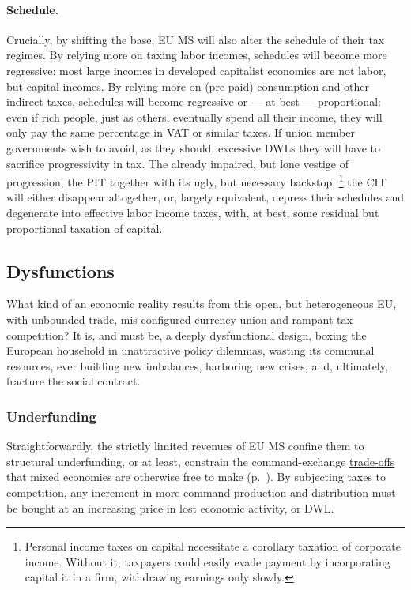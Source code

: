 \paragraph{Schedule.} Crucially, by shifting the base, \gls{EU} \gls{MS} will also alter the schedule of their tax regimes.
By relying more on taxing labor incomes, schedules will become more regressive:
most large incomes in developed capitalist economies are not labor, but capital incomes.
By relying more on (pre-paid) consumption and other indirect taxes, schedules will become regressive or --- at best --- proportional:
even if rich people, just as others, eventually spend all their income, they will only pay the same percentage in \gls{VAT} or similar taxes.
If union member governments wish to avoid, as they should, excessive \glspl{DWL} they will have to sacrifice progressivity in tax.
The already impaired, but lone vestige of progression, the \gls{PIT} together with its ugly, but necessary backstop,
\footnote{
	Personal income taxes on capital necessitate a corollary taxation of corporate income.
	Without it, taxpayers could easily evade payment by incorporating capital it in a firm, withdrawing earnings only slowly.
}
the \gls{CIT} will either disappear altogether, or, largely equivalent, depress their schedules and degenerate into effective labor income taxes, with, at best, some residual but proportional taxation of capital.

\subsection{Dysfunctions} \label{sec:defunct} What kind of an economic reality results from this open, but heterogeneous \gls{EU}, with unbounded trade, mis-configured currency union and rampant tax competition?
It is, and must be, a deeply dysfunctional design, boxing the European household in unattractive policy dilemmas, wasting its communal resources, ever building new imbalances, harboring new crises, and, ultimately, fracture the social contract.

\subsubsection{Underfunding} \label{sec:public-squalor} Straightforwardly, the strictly limited revenues of \gls{EU} \gls{MS} confine them to structural underfunding, or at least, constrain the command-exchange \hyperref[sec:trade-offs]{trade-offs} that mixed economies are otherwise free to make (p.~\pageref{sec:trade-offs}).
By subjecting taxes to competition, any increment in more command production and distribution must be bought at an increasing price in lost economic activity, or \gls{DWL}.

